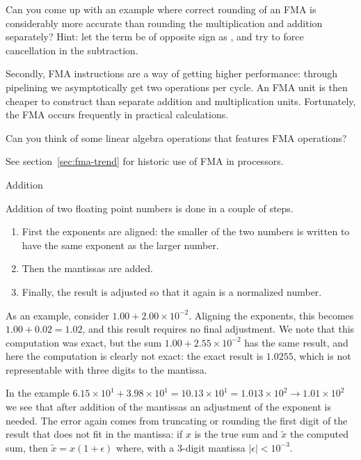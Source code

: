 \begin{exercise}
  Can you come up with an example where correct rounding of
  an \ac{FMA} is considerably more accurate than rounding the
  multiplication and addition separately? Hint: let the  term be
  of opposite sign as , and try to force cancellation in the
  subtraction.
\end{exercise}

Secondly, \ac{FMA} instructions are a way of getting higher
performance: through pipelining we asymptotically get two operations
per cycle. An \ac{FMA} unit is then cheaper to construct than separate
addition and multiplication units. Fortunately, the \ac{FMA} occurs
frequently in practical calculations.

\begin{exercise}
  Can you think of some linear algebra operations that features
  \ac{FMA} operations?
\end{exercise}

See section~\ref{sec:fma-trend} for historic use of \ac{FMA} in processors.

 {Addition}

Addition of two floating point numbers is done in a couple of steps.
\begin{enumerate}
\item
  First the exponents are aligned: the smaller of the two numbers is
  written to have the same exponent as the larger number.
\item Then the
  mantissas are added.
\item Finally, the result is adjusted
  so that it again is a normalized number.
\end{enumerate}
As an example, consider $1.00+2.00\times 10^{-2}$. Aligning the
exponents, this becomes $1.00+0.02=1.02$, and this result requires no
final adjustment. We note that this computation was exact, but
the sum $1.00+2.55\times 10^{-2}$ has the same result, and here the
computation is clearly not exact: the exact result is $1.0255$, which
is not representable with three digits to the mantissa.

In the example $6.15\times 10^1+3.98\times 10^1=10.13\times 10^1=1.013\times
10^2\rightarrow 1.01\times 10^2$ we see that after addition of the mantissas an
adjustment of the exponent is needed. The error again comes from
truncating or rounding the first digit of the result that does not fit
in the mantissa: if $x$ is the true sum and $\tilde x$ the computed
sum, then $\tilde x=x(1+\epsilon)$ where, with a 3-digit mantissa
$|\epsilon|<10^{-3}$.

